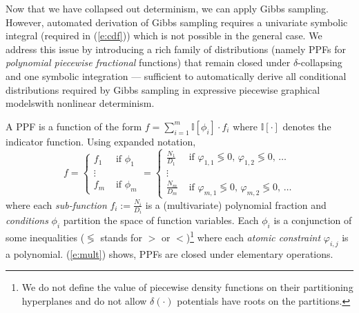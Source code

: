 \documentclass[letterpaper]{article}
\newcommand{\indicator}{\mathbb{I}}%
\newcommand{\case}[2]{#2 &\text{ if } #1}%
\begin{document}
Now that we have collapsed out determinism, we can apply Gibbs sampling. However, automated derivation of Gibbs sampling requires a univariate symbolic integral (required in (\ref{e:cdf})) which is not possible in the general case.
We address this issue by introducing a rich family of distributions (namely PPFs for \emph{polynomial piecewise fractional} functions) that remain closed under $\delta$-collapsing and one symbolic integration --- sufficient to automatically derive all conditional distributions required by Gibbs sampling in expressive piecewise graphical modelswith nonlinear determinism.  

A PPF is a function of the form
$f = \sum_{i=1}^m \indicator[\phi_i]\cdot f_i $ where $\indicator[\cdot]$ denotes the indicator function.
Using expanded notation, 
{\footnotesize
\begin{equation}
\label{e:ppf}
f =
  \begin{cases}
  \case{\phi_1}{f_1}\\
\vdots\\
  \case{\phi_m}{f_m}    
  \end{cases}
\!\!=
  \begin{cases}
  \case{\varphi_{1,1} \lessgtr 0,\, \varphi_{1,2} \lessgtr 0,\, \ldots}{\frac{N_1}{D_1}} \\
\vdots\\
   \case{\varphi_{m,1} \lessgtr 0,\, \varphi_{m,2} \lessgtr 0,\, \ldots}{\frac{N_m}{D_m}}    
  \end{cases}
\end{equation}
}
where each \emph{sub-function} $f_i := \frac{N_i}{D_i}$ is a (multivariate) polynomial fraction and
\emph{conditions} $\phi_i$ partition the space of function variables. 
Each $\phi_i$ is a conjunction of some inequalities ($\lessgtr$ stands for  
$>$ or $<$)\footnote{
We do not define the value of piecewise density functions on their partitioning hyperplanes and do not allow $\delta(\cdot)$ potentials have roots on the partitions. 
} 
where each \emph{atomic constraint} $\varphi_{i,j}$ is a polynomial.
(\ref{e:mult}) shows, PPFs are closed under elementary operations. 
\\
\end{document}
